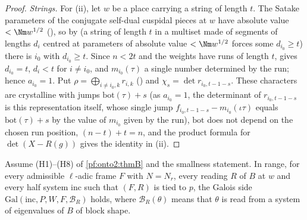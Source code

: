 \begin{proof}
\emph{Strings.} For (ii), let $w$ be a place carrying a string of length $t$. The Satake parameters of the conjugate self-dual cuspidal
pieces at $w$ have absolute value $<\Nm w^{1/2}$ (), so by
 (a string of length $t$ in a multiset made of segments of lengths $d_i$ centred at
parameters of absolute value $<\Nm w^{1/2}$ forces some $d_{i_0}\ge t$) there is $i_0$ with $d_{i_0}\ge t$. Since $n<2t$ and the weights
have runs of length $t$,  gives $d_{i_0}=t$, $d_i<t$ for $i\ne i_0$, and $m_{i_0}(\tau)$ a
single number determined by the run; hence $a_{i_0}=1$. Put $\rho=\bigoplus_{i\ne i_0,k}r_{i,k}$ ()
and $\chi_s=\det r_{i_0,t-1-s}$. These characters are crystalline with jumps $\mathrm{bot}(\tau)+s$
(as $a_{i_0}=1$, the determinant of $r_{i_0,t-1-s}$ is this representation itself, whose single jump
$f_{i_0,t-1-s}-m_{i_0}(\iota\tau)$ equals $\mathrm{bot}(\tau)+s$ by the value of $m_{i_0}$ given by the run), $\mathrm{bot}$ does not depend on the chosen run position, $(n-t)+t=n$, and the product formula for $\det(X-R(g))$ gives the
identity in (ii).
\end{proof}

\begin{proposition}\label{pf:onto2:galois}
Assume (H1)--(H8) of \cref{pf:onto2:thmB} and the smallness statement. In range, for every admissible $\ell$-adic frame $F$ with $N=N_r$,
every reading $R$ of $B$ at $w$ and every half system $\mathrm{inc}$ such that $(F,R)$ is tied to $p$, the Galois side
$\mathrm{Gal}(\mathrm{inc},P,W,F,\mathcal B_R)$ holds, where $\mathcal B_R(\theta)$ means that $\theta$ is read from a system of eigenvalues
of $B$ of block shape.
\end{proposition}

